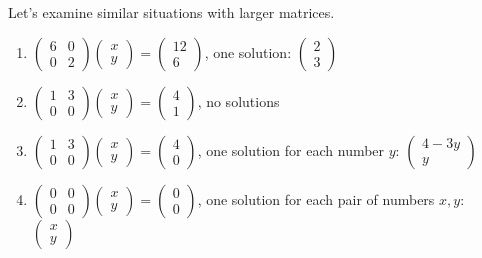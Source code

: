Let's examine similar situations with larger matrices.
\begin{enumerate}
\item
$\begin{pmatrix}
6	&0 	\\
0 	&2 	
\end{pmatrix} 
\begin{pmatrix}
 x \\ 
y 
\end{pmatrix} 
=
\begin{pmatrix}
12 \\ 
6
\end{pmatrix}$, one solution: 
$\begin{pmatrix}
2 \\ 
3
\end{pmatrix}$

\item 
$\begin{pmatrix}
1	&3 	\\
0 	&0 	
\end{pmatrix} 
\begin{pmatrix}
 x \\ 
y 
\end{pmatrix} 
=
\begin{pmatrix}
4 \\ 
1 
\end{pmatrix}$, no solutions

\item 
$\begin{pmatrix}
1	&3 	\\
0 	&0 	
\end{pmatrix} 
\begin{pmatrix}
 x \\ 
y 
\end{pmatrix} 
=
\begin{pmatrix}
4 \\ 
0
\end{pmatrix} $, one solution for each number $y$: 
$\begin{pmatrix}
4-3y \\ 
y
\end{pmatrix} $

\item 
$\begin{pmatrix}
0	&0 	\\
0 	&0 	
\end{pmatrix} 
\begin{pmatrix}
 x \\ 
y 
\end{pmatrix} 
=
\begin{pmatrix}
0 \\ 
0
\end{pmatrix} $, one solution for each pair of numbers $x,y$:
$\begin{pmatrix}
x\\ 
y
\end{pmatrix} $
\end{enumerate}
